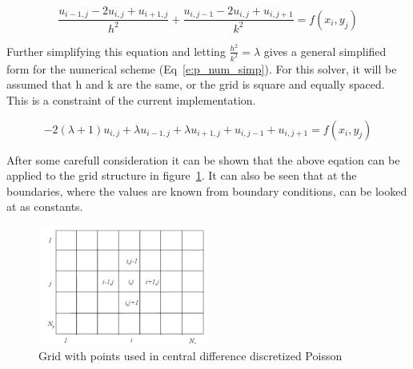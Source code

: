 \documentclass[]{aiaa-tc}%
\begin{document}
\begin{equation}
  \label{e:p_num}
  \frac{u_{i-1,j} - 2u_{i,j} + u_{i+1,j}}{h^2} + \frac{u_{i,j-1} - 2u_{i,j} + u_{i,j+1}}{k^2} = f(x_i,y_j)
\end{equation}

Further simplifying this equation and letting $\frac{h^2}{k^2} = \lambda$ gives a
general simplified form for the numerical scheme (Eq~\ref{e:p_num_simp}). For this
solver, it will be assumed that h and k are the same, or the grid is square and
equally spaced. This is a constraint of the current implementation.

\begin{equation}
  \label{e:p_num_simp}
  - 2(\lambda + 1)u_{i,j} + \lambda u_{i-1,j} + \lambda u_{i+1,j}  + u_{i,j-1} + u_{i,j+1} = f(x_i,y_j)
\end{equation}

After some carefull consideration it can be shown that the above eqation can be
applied to the grid structure in figure~\ref{f:cdiff_grid}. It can also be seen
that at the boundaries, where the values are known from boundary conditions, can
be looked at as constants.

\begin{figure}
  \centering
  \label{f:cdiff_grid}
  \caption{Grid with points used in central difference discretized Poisson}
  \includegraphics[width=0.5\textwidth]{cdiff_grid.png}
\end{figure}
\end{document}
